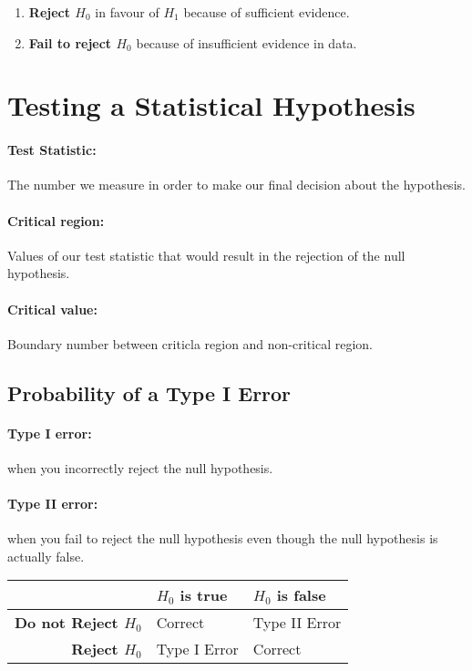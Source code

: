 \documentclass[a4paper,12pt]{report}
\begin{document}
\begin{enumerate}
\item \textbf{Reject $H_0$ } in favour of $H_1$ because of sufficient evidence. 
\item \textbf{Fail to reject $H_0$ } because of insufficient evidence in data.
\end{enumerate}

 
\section{Testing a Statistical Hypothesis}

\paragraph{Test Statistic: } The number we measure in order to make our final decision about the hypothesis. 

\paragraph{Critical region: } Values of our test statistic that would result in the rejection of the null hypothesis. 

\paragraph{Critical value: } Boundary number between criticla region and non-critical region.

\subsection{Probability of a Type I Error}

\paragraph{Type I error: } when you incorrectly reject the null hypothesis.

\paragraph{Type II error: } when you fail to reject the null hypothesis even though the null hypothesis is actually false.

\begin{tabular}{|| r | l | l ||}
\hline
& \textbf{$H_0$ is true} & \textbf{$H_0$ is false} \\
\hline

\textbf{Do not Reject $H_0$} & Correct & Type II Error \\

\textbf{Reject $H_0$} & Type I Error & Correct \\

\hline
\end{tabular}
\end{document}
